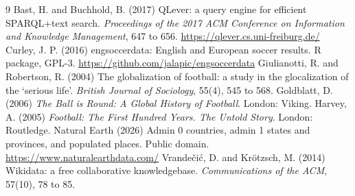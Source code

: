 \documentclass[11pt,a4paper]{article}
\begin{document}
\begin{thebibliography}{9}
 Bast, H. and Buchhold, B. (2017) QLever: a query engine for efficient SPARQL+text search. \emph{Proceedings of the 2017 ACM Conference on Information and Knowledge Management}, 647 to 656. \url{https://qlever.cs.uni-freiburg.de/}
 Curley, J. P. (2016) engsoccerdata: English and European soccer results. R package, GPL-3. \url{https://github.com/jalapic/engsoccerdata}
 Giulianotti, R. and Robertson, R. (2004) The globalization of football: a study in the glocalization of the `serious life'. \emph{British Journal of Sociology}, 55(4), 545 to 568.
 Goldblatt, D. (2006) \emph{The Ball is Round: A Global History of Football}. London: Viking.
 Harvey, A. (2005) \emph{Football: The First Hundred Years. The Untold Story}. London: Routledge.
 Natural Earth (2026) Admin 0 countries, admin 1 states and provinces, and populated places. Public domain. \url{https://www.naturalearthdata.com/}
 Vrandečić, D. and Krötzsch, M. (2014) Wikidata: a free collaborative knowledgebase. \emph{Communications of the ACM}, 57(10), 78 to 85.
\end{thebibliography}
\end{document}
